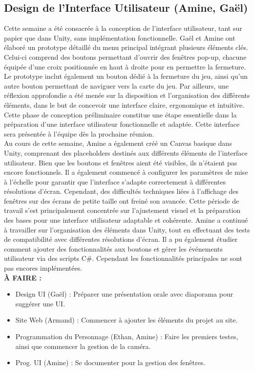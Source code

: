 \documentclass{report}
\begin{document}
\subsection*{Design de l'Interface Utilisateur (Amine, Gaël)}
Cette semaine a été consacrée à la conception de l’interface utilisateur, tant sur papier que dans Unity, sans implémentation fonctionnelle. Gaël et Amine ont élaboré un prototype détaillé du menu principal intégrant plusieurs éléments clés. Celui-ci comprend des boutons permettant d’ouvrir des fenêtres pop-up, chacune équipée d’une croix positionnée en haut à droite pour en permettre la fermeture. Le prototype inclut également un bouton dédié à la fermeture du jeu, ainsi qu’un autre bouton permettant de naviguer vers la carte du jeu. Par ailleurs, une réflexion approfondie a été menée sur la disposition et l’organisation des différents éléments, dans le but de concevoir une interface claire, ergonomique et intuitive. Cette phase de conception préliminaire constitue une étape essentielle dans la préparation d’une interface utilisateur fonctionnelle et adaptée. Cette interface sera présentée à l'équipe dès la prochaine réunion.
\\[0.4cm]
Au cours de cette semaine, Amine a également créé un Canvas basique dans Unity, comprenant des placeholders destinés aux différents éléments de l’interface utilisateur. Bien que les boutons et fenêtres aient été visibles, ils n’étaient pas encore fonctionnels. Il a également commencé à configurer les paramètres de mise à l’échelle pour garantir que l’interface s’adapte correctement à différentes résolutions d’écran. Cependant, des difficultés techniques liées à l’affichage des fenêtres sur des écrans de petite taille ont freiné son avancée. Cette période de travail s’est principalement concentrée sur l’ajustement visuel et la préparation des bases pour une interface utilisateur adaptable et cohérente. Amine a continué à travailler sur l’organisation des éléments dans Unity, tout en effectuant des tests de compatibilité avec différentes résolutions d’écran. Il a pu également étudier comment ajouter des fonctionnalités aux boutons et gérer les événements utilisateur via des scripts C\#. Cependant les fonctionnalités principales ne sont pas encores implémentées.
\\[1cm]
\textbf{À FAIRE :}
\begin{itemize}
    \item Design UI (Gaël) : Préparer une présentation orale avec diaporama pour suggérer une UI.
    \item Site Web (Armand) : Commencer à ajouter les éléments du projet au site.
    \item Programmation du Personnage (Ethan, Amine) : Faire les premiers testes, ainsi que commencer la gestion de la caméra.
    \item Prog. UI (Amine) : Se documenter pour la gestion des fenêtres.
\end{itemize}
\end{document}
